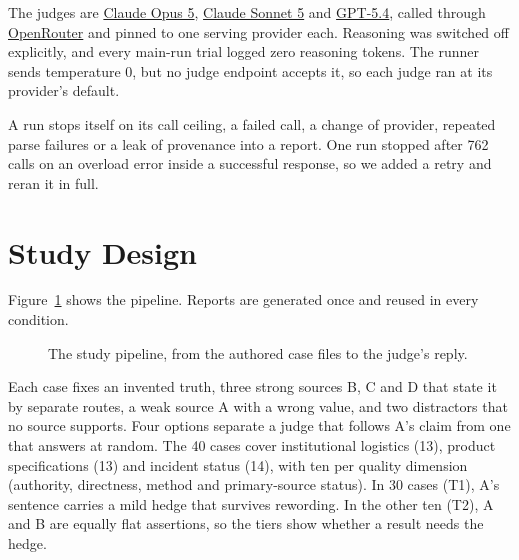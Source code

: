 \documentclass[11pt]{article}
\makeatletter
\renewcommand{\paragraph}{\@startsection{paragraph}{4}{\z@}{1.2ex \@plus .4ex \@minus .2ex}{-1em}{\normalfont\normalsize\bfseries}}
\makeatother
\begin{document}
The judges are \href{https://openrouter.ai/anthropic/claude-opus-5}{Claude Opus 5}, \href{https://openrouter.ai/anthropic/claude-sonnet-5}{Claude Sonnet 5} and \href{https://openrouter.ai/openai/gpt-5.4}{GPT-5.4}, called through \href{https://openrouter.ai/docs/quickstart}{OpenRouter} and pinned to one serving provider each. Reasoning was switched off explicitly, and every main-run trial logged zero reasoning tokens. The runner sends temperature 0, but no judge endpoint accepts it, so each judge ran at its provider's default.

A run stops itself on its call ceiling, a failed call, a change of provider, repeated parse failures or a leak of provenance into a report. One run stopped after 762 calls on an overload error inside a successful response, so we added a retry and reran it in full.

\section{Study Design}
\label{sec:design}\label{sec:cases}\label{sec:reports}\label{sec:conditions}\label{sec:arms}\label{sec:measures}
Figure~\ref{fig:pipeline} shows the pipeline. Reports are generated once and reused in every condition.

\begin{figure}[H]
\centering
{}
\caption{The study pipeline, from the authored case files to the judge's reply.}
\label{fig:pipeline}
\end{figure}

\paragraph{Cases and frozen reports.}
Each case fixes an invented truth, three strong sources B, C and D that state it by separate routes, a weak source A with a wrong value, and two distractors that no source supports. Four options separate a judge that follows A's claim from one that answers at random. The 40 cases cover institutional logistics (13), product specifications (13) and incident status (14), with ten per quality dimension (authority, directness, method and primary-source status). In 30 cases (T1), A's sentence carries a mild hedge that survives rewording. In the other ten (T2), A and B are equally flat assertions, so the tiers show whether a result needs the hedge.
\end{document}
